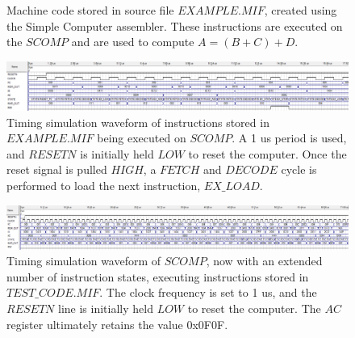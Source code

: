 \documentclass{article}
\newcommand{\includecode}[2][c]{}
\begin{document}
	\addtolength{\topmargin}{-.5in} %
	\begin{figure}%
	\includecode{example.mif}
	\captionsetup{width=1.55\textwidth, labelfont=bf,singlelinecheck=true, justification=justified}
	\caption{Machine code stored in source file $EXAMPLE.MIF$, created using the Simple Computer assembler. These instructions are executed on the $SCOMP$ and are used to compute $A = (B+C) + D$.}
	\end{figure}
	\vspace{3pt}
	\begin{figure}%
		\includegraphics[scale=0.5,center]{waveform.PNG} %
		\captionsetup{width=1.55\textwidth, labelfont=bf,singlelinecheck=true, justification=justified}
		\caption{Timing simulation waveform of instructions stored in $EXAMPLE.MIF$ being executed on $SCOMP$. A 1 us period is used, and $RESETN$ is initially held $LOW$ to reset the computer. Once the reset signal is pulled $HIGH$, a $FETCH$ and $DECODE$ cycle is performed to load the next instruction, $EX\_LOAD$.}
	\end{figure}
	\vspace{3pt}
	\begin{figure}%
		\includegraphics[scale=0.45,center]{sim_comp.PNG}
		\captionsetup{width=1.55\textwidth, labelfont=bf,singlelinecheck=true, justification=justified}
		\caption{Timing simulation waveform of $SCOMP$, now with an extended number of instruction states, executing instructions stored in $TEST\_CODE.MIF$. The clock frequency is set to 1 us, and the $RESETN$ line is initially held $LOW$ to reset the computer. The $AC$ register ultimately retains the value 0x0F0F.}
	\end{figure}
	\vspace{3pt}
\end{document}
